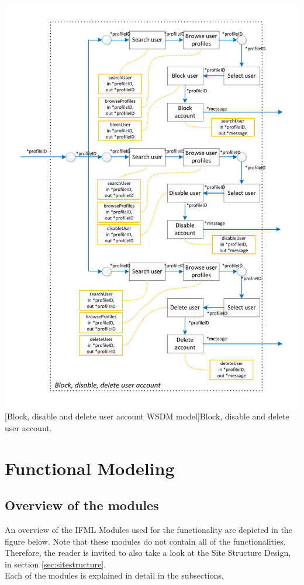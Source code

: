 \documentclass[11pt, a4paper,svglistings,oneside]{book}
\begin{document}
$\;$ \\
\noindent\begin{minipage}{\textwidth}
    \centering
   \includegraphics[scale=1]{nav_BlockDisableDelete.pdf}
 [Block, disable and delete user account WSDM model]{Block, disable and delete user account.}
\end{minipage}

\section{Functional Modeling}

\subsection{Overview of the modules}

An overview of the IFML Modules used for the functionality are depicted in the figure below. Note that these modules do not contain all of the functionalities. Therefore, the reader is invited to also take a look at the Site Structure Design, in section \ref{sec:sitestructure}. \\
Each of the modules is explained in detail in the subsections.
\end{document}
